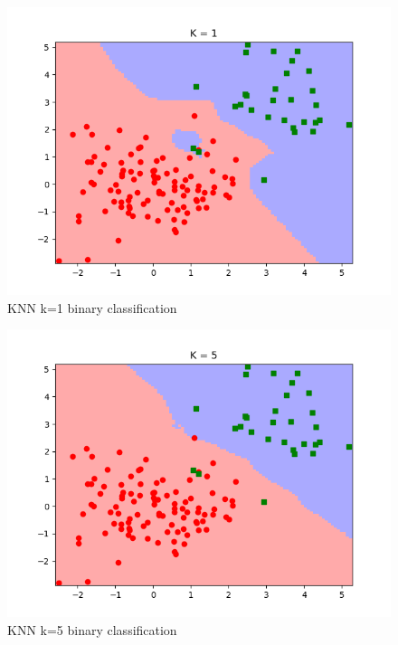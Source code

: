 \documentclass[10pt]{article}
\begin{document}
\begin{itemize}
\begin{figure}[H]
\centering
  \includegraphics[width=\linewidth]{code/knn_binary_data-k-1.png}
 \caption{KNN k=1 binary classification}
\label{label}
\end{figure}

\begin{figure}[H]
\centering
  \includegraphics[width=\linewidth]{code/knn_binary_data-k-5.png}
 \caption{KNN k=5 binary classification}
\label{label}
\end{figure}


\end{itemize}
\end{document}
